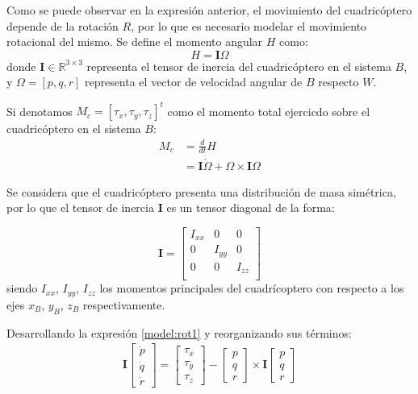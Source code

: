 Como se puede observar en la expresión anterior, el movimiento del cuadricóptero depende de la rotación $R$, por lo que es necesario modelar el movimiento rotacional del mismo. Se define el momento angular $H$ como:
\begin{equation}
	H = \mathbf{I}\Omega
\end{equation}
donde $\mathbf{I} \in \mathbb{R}^{3\times 3}$ representa el tensor de inercia del cuadricóptero en el sistema $B$, y $\Omega  = [p, q, r]$ representa el vector de velocidad angular de $B$ respecto $W$. 

Si denotamos $M_c = [\tau_x, \tau_y, \tau_z]^t$ como el momento total ejercicdo sobre el cuadricóptero en el sistema $B$:
\begin{align}
	M_c &= \frac{d}{dt}H\nonumber\\
		&= \mathbf{I}\dot{\Omega}+\Omega\times\mathbf{I}\Omega
	\label{model:rot1}
\end{align}

Se considera que el cuadricóptero presenta una distribución de masa simétrica, por lo que el tensor de inercia $\mathbf{I}$ es un tensor diagonal de la forma:

\begin{equation}
	\mathbf{I} = \begin{bmatrix}
		I_{xx}&0&0\\
		0&I_{yy}&0\\
		0&0&I_{zz}\\
	\end{bmatrix}
\end{equation}
siendo $I_{xx}$, $I_{yy}$, $I_{zz}$ los momentos principales del cuadrícoptero con respecto a los ejes $x_B$, $y_B$, $z_B$ respectivamente.

Desarrollando la expresión \ref{model:rot1} y reorganizando sus términos:
\begin{align}
\mathbf{I}\begin{bmatrix}
	\dot{p}\\
	\dot{q}\\
	\dot{r}
\end{bmatrix}=
\begin{bmatrix}
	\tau_x\\
	\tau_y\\
	\tau_z
\end{bmatrix} -\begin{bmatrix}
	p\\
	q\\
	r
\end{bmatrix} \times\mathbf{I}\begin{bmatrix}
	p\\
	q\\
	r
\end{bmatrix}\label{model:rot2}
\end{align}

